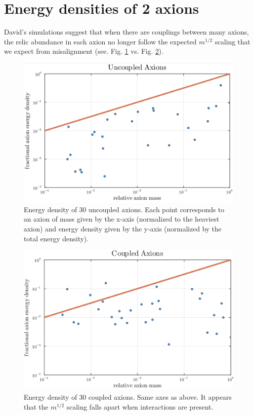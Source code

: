\documentclass{article}
\begin{document}
\section{Energy densities of 2 axions}

David's simulations suggest that when there are couplings between many axions, the relic abundance in each axion no longer follow the expected $m^{1/2}$ scaling that we expect from misalignment (see. Fig. \ref{fig:e-density-uncoupled} vs. Fig. \ref{fig:e-density-coupled}).

\begin{figure}[h]
    \centering
    \includegraphics[width=0.9\linewidth]{figs/Uncoupled_Axions.png}
    \caption{Energy density of 30 uncoupled axions. Each point corresponds to an axion of mass given by the x-axis (normalized to the heaviest axion) and energy density given by the y-axis (normalized by the total energy density).}
    \label{fig:e-density-uncoupled}
\end{figure}
\begin{figure}[h]
    \centering
    \includegraphics[width=0.9\linewidth]{figs/Coupled_Axions.png}
    \caption{Energy density of 30 coupled axions. Same axes as above. It appears that the $m^{1/2}$ scaling falls apart when interactions are present.}
    \label{fig:e-density-coupled}
\end{figure}
\end{document}
